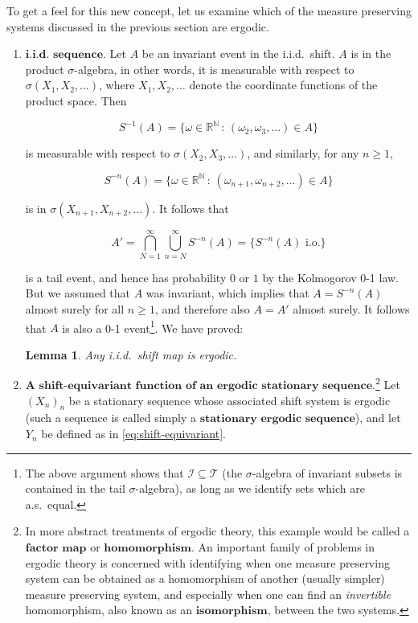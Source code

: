 \documentclass[11pt]{report}
\newcommand{\R}{\mathbb{R}}
\newcommand{\N}{\mathbb{N}}
\theoremstyle{plain}
\newtheorem{lem}[thm]{Lemma}
\theoremstyle{definition}
\begin{document}
\noindent To get a feel for this new concept, let us examine
which of the measure preserving systems discussed in
the previous section are ergodic.

\begin{enumerate}[label=\arabic*.]
\item $\textbf{i.i.d. sequence.}$ Let $A$ be an invariant
event in the i.i.d.\ shift. $A$ is in the product
$\sigma$-algebra, in other words, it is measurable
with respect to $\sigma(X_1,X_2,\ldots)$, where
$X_1,X_2,\ldots$ denote the coordinate functions of
the product space. Then

\[
S^{-1}(A) = \{ \omega\in \R^\N \, : \, (\omega_2,\omega_3,\ldots) \in A \}
\]

\noindent is measurable with respect to
$\sigma(X_2,X_3,\ldots)$, and similarly, for any
$n\ge 1$,

\[
S^{-n}(A) = \{ \omega\in \R^\N \, : \, (\omega_{n+1},\omega_{n+2},\ldots) \in A \}
\]

\noindent is in $\sigma(X_{n+1},X_{n+2},\ldots)$. It follows
that

\[
A'=\bigcap_{N=1}^\infty \bigcup_{n=N}^\infty S^{-n}(A) = \{ S^{-n}(A) \textrm{ i.o.} \}
\]

\noindent is a tail event, and hence has probability $0$ or $1$
by the Kolmogorov 0-1 law. But we assumed that $A$
was invariant, which implies that $A=S^{-n}(A)$
almost surely for all $n\ge 1$, and therefore also
$A=A'$ almost surely. It follows that $A$ is also a
0-1 event\footnote{The above argument shows that
$\mathcal{I}\subseteq\mathcal{T}$ (the
$\sigma$-algebra of invariant subsets is contained in
the tail $\sigma$-algebra), as long as we identify
sets which are a.s.\ equal.}. We have proved:

\begin{lem}
\label{lem-iid-ergodic}
Any i.i.d.\ shift map is ergodic.
\end{lem}

\item $\textbf{A shift-equivariant function of an ergodic
stationary sequence.}$\footnote{In more abstract treatments of ergodic theory, this
example would be called a $\textbf{factor map}$ or
$\textbf{homomorphism}$. An important family of
problems in ergodic theory is concerned with
identifying when one measure preserving system can be
obtained as a homomorphism of another (usually
simpler) measure preserving system, and especially
when one can find an \emph{invertible} homomorphism, also
known as an $\textbf{isomorphism}$, between the two
systems.}
Let $(X_n)_n$ be a stationary sequence whose
associated shift system is ergodic (such a sequence is
called simply a
$\textbf{stationary ergodic sequence}$), and let $Y_n$
be defined as in \eqref{eq:shift-equivariant}.


\end{enumerate}
\end{document}
